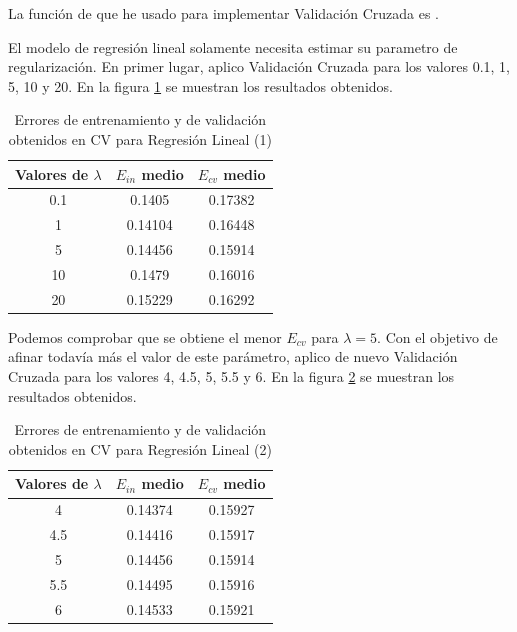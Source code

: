\documentclass[10pt,a4paper]{article}
\begin{document}
La función de  que he usado para implementar Validación Cruzada es .

El modelo de regresión lineal solamente necesita estimar su parametro de regularización. En primer lugar, aplico Validación Cruzada para los valores 0.1, 1, 5, 10 y 20. En la figura \ref{fig:reg_plr_cv1} se muestran los resultados obtenidos.

\begin{table}[h]
	\centering
	\begin{tabular}{|c|c|c|}
		\hline
		\textbf{Valores de $\lambda$} & \textbf{$E_{in}$ medio} & \textbf{$E_{cv}$ medio} \\ \hline
		0.1                           & 0.1405                  & 0.17382                 \\ \hline
		1                             & 0.14104                 & 0.16448                 \\ \hline
		5                             & 0.14456                 & 0.15914                 \\ \hline
		10                            & 0.1479                  & 0.16016                 \\ \hline
		20                            & 0.15229                 & 0.16292                 \\ \hline
	\end{tabular}
	\caption{Errores de entrenamiento y de validación obtenidos en CV para Regresión Lineal (1)}
	\label{fig:reg_plr_cv1}
\end{table}

Podemos comprobar que se obtiene el menor $E_{cv}$ para $\lambda = 5$. Con el objetivo de afinar todavía más el valor de este parámetro, aplico de nuevo Validación Cruzada para los valores 4, 4.5, 5, 5.5 y 6. En la figura \ref{fig:reg_plr_cv2} se muestran los resultados obtenidos.

\begin{table}[h]
	\centering
	\begin{tabular}{|c|c|c|}
		\hline
		\textbf{Valores de $\lambda$} & \textbf{$E_{in}$ medio} & \textbf{$E_{cv}$ medio} \\ \hline
		4                             & 0.14374                 & 0.15927                 \\ \hline
		4.5                           & 0.14416                 & 0.15917                 \\ \hline
		5                             & 0.14456                 & 0.15914                 \\ \hline
		5.5                           & 0.14495                 & 0.15916                 \\ \hline
		6                             & 0.14533                 & 0.15921                 \\ \hline
	\end{tabular}
\caption{Errores de entrenamiento y de validación obtenidos en CV para Regresión Lineal (2)}
	\label{fig:reg_plr_cv2}
\end{table}
\end{document}
